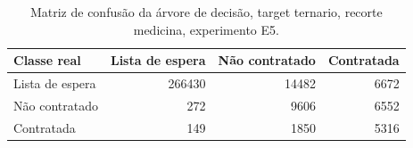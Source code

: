 \begin{table}
\caption{Matriz de confusão da árvore de decisão, target ternario, recorte medicina, experimento E5.}
\label{tab:matriz_confusao_treeClassification_10_profundidade_ternario_recorte_medicina_in_sample_e5}
\begin{tabular}{lrrr}
\toprule
Classe real & Lista de espera & Não contratado & Contratada \\
\midrule
Lista de espera & 266430 & 14482 & 6672 \\
Não contratado & 272 & 9606 & 6552 \\
Contratada & 149 & 1850 & 5316 \\
\bottomrule
\end{tabular}
\end{table}
